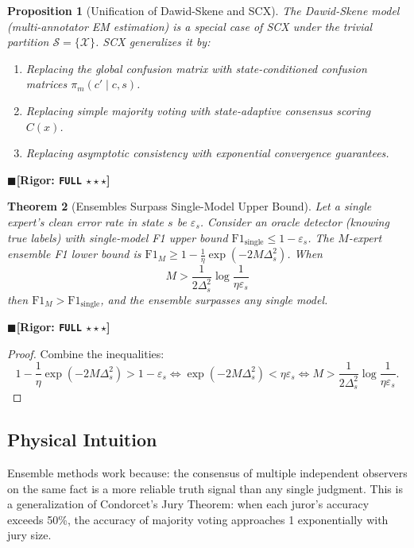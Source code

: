 \documentclass[12pt,a4paper]{article}
\newtheorem{theorem}{Theorem}[section]
\newtheorem{proposition}[theorem]{Proposition}
\theoremstyle{definition}
\theoremstyle{remark}
\newcommand{\rigorFull}{$\blacksquare$\;\textbf{[Rigor: \texttt{FULL} $\star\star\star$]}}
\begin{document}
\begin{proposition}[Unification of Dawid-Skene and SCX]
\label{prop:3}
The Dawid-Skene model (multi-annotator EM estimation) is a special case of SCX under the trivial partition $\mathcal{S} = \{\mathcal{X}\}$. SCX generalizes it by:
\begin{enumerate}[label=\arabic*.]
\item Replacing the global confusion matrix with state-conditioned confusion matrices $\pi_m(c' \mid c, s)$.
\item Replacing simple majority voting with state-adaptive consensus scoring $C(x)$.
\item Replacing asymptotic consistency with exponential convergence guarantees.
\end{enumerate}
\end{proposition}
\rigorFull

\begin{theorem}[Ensembles Surpass Single-Model Upper Bound]
\label{thm:2.1}
Let a single expert's clean error rate in state $s$ be $\varepsilon_s$. Consider an oracle detector (knowing true labels) with single-model F1 upper bound $\mathrm{F1}_{\text{single}} \leq 1 - \varepsilon_s$. The $M$-expert ensemble F1 lower bound is $\mathrm{F1}_M \geq 1 - \frac{1}{\eta}\exp(-2M\Delta_s^2)$. When
\begin{equation}
M > \frac{1}{2\Delta_s^2}\log\frac{1}{\eta\varepsilon_s}
\end{equation}
then $\mathrm{F1}_M > \mathrm{F1}_{\text{single}}$, and the ensemble surpasses any single model.
\end{theorem}
\rigorFull

\begin{proof}
Combine the inequalities:
\begin{equation}
1 - \frac{1}{\eta}\exp(-2M\Delta_s^2) > 1 - \varepsilon_s \iff \exp(-2M\Delta_s^2) < \eta\varepsilon_s \iff M > \frac{1}{2\Delta_s^2}\log\frac{1}{\eta\varepsilon_s}.
\end{equation}
\end{proof}

\subsection{Physical Intuition}
Ensemble methods work because: the consensus of multiple independent observers on the same fact is a more reliable truth signal than any single judgment. This is a generalization of Condorcet's Jury Theorem: when each juror's accuracy exceeds 50\%, the accuracy of majority voting approaches 1 exponentially with jury size.
\end{document}
